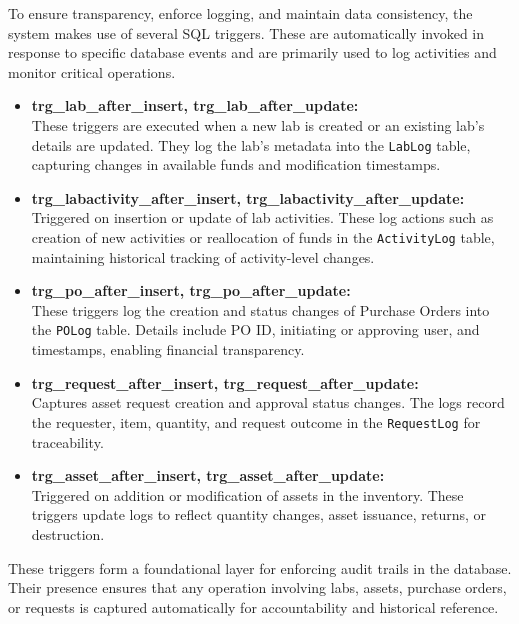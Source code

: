 \documentclass[11pt]{article}
\begin{document}
To ensure transparency, enforce logging, and maintain data consistency, the system makes use of several SQL triggers. These are automatically invoked in response to specific database events and are primarily used to log activities and monitor critical operations.

\begin{itemize}
  \item \textbf{trg\_lab\_after\_insert, trg\_lab\_after\_update:} \\
  These triggers are executed when a new lab is created or an existing lab's details are updated. They log the lab's metadata into the \texttt{LabLog} table, capturing changes in available funds and modification timestamps.

  \item \textbf{trg\_labactivity\_after\_insert, trg\_labactivity\_after\_update:} \\
  Triggered on insertion or update of lab activities. These log actions such as creation of new activities or reallocation of funds in the \texttt{ActivityLog} table, maintaining historical tracking of activity-level changes.

  \item \textbf{trg\_po\_after\_insert, trg\_po\_after\_update:} \\
  These triggers log the creation and status changes of Purchase Orders into the \texttt{POLog} table. Details include PO ID, initiating or approving user, and timestamps, enabling financial transparency.

  \item \textbf{trg\_request\_after\_insert, trg\_request\_after\_update:} \\
  Captures asset request creation and approval status changes. The logs record the requester, item, quantity, and request outcome in the \texttt{RequestLog} for traceability.

  \item \textbf{trg\_asset\_after\_insert, trg\_asset\_after\_update:} \\
  Triggered on addition or modification of assets in the inventory. These triggers update logs to reflect quantity changes, asset issuance, returns, or destruction.
\end{itemize}

These triggers form a foundational layer for enforcing audit trails in the database. Their presence ensures that any operation involving labs, assets, purchase orders, or requests is captured automatically for accountability and historical reference.
\end{document}
